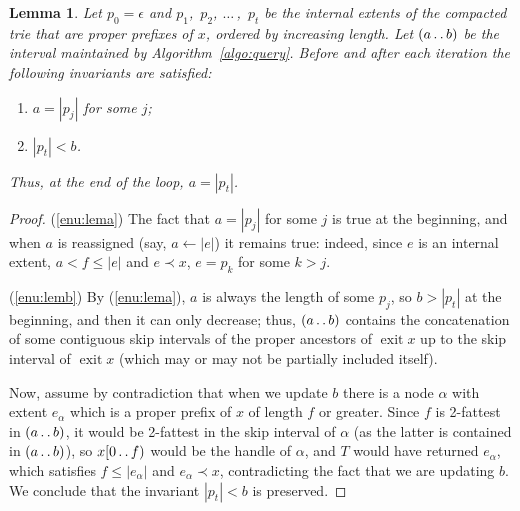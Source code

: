 \documentclass[a4paper,11pt]{article}
\newtheorem{lemma}[theorem]{Lemma}
\newcommand{\?}{\mskip1.5mu}
\def\..{\,\mathpunct{\ldotp\ldotp}} %
\DeclareMathOperator{\exit}{exit}
\begin{document}

\begin{lemma}\label{lem:correctness}
Let $p_0=\epsilon$ and $p_1$,~$p_2$,
$\dots\,$,~$p_t$ be the internal extents of the compacted
trie that are \emph{proper} prefixes of $x$, ordered by increasing length. 
Let $(a\..b)$ be the interval maintained by 
Algorithm~\ref{algo:query}. Before and after each iteration the following invariants 
are satisfied: 
\begin{enumerate}
    \item\label{enu:lema} $a=|p_j|$ for some $j$;
    \item\label{enu:lemb} $|p_t|< b$.
\end{enumerate}
Thus, at the end of the loop, $a=|p_t|$.
\end{lemma}
\begin{proof}
\noindent(\ref{enu:lema})
The fact that $a=|p_j|$ for some $j$ is true at the beginning, and when
$a$ is reassigned (say, $a \leftarrow |e|$) it remains true: indeed, since $e$
is an internal extent, $a<f\leq |e|$ and $e\prec x$, $e=p_k$ for some $k>j$.

\noindent(\ref{enu:lemb})
By (\ref{enu:lema}), $a$ is always the length of some $p_j$,
so $b>|p_t|$ at the beginning, and then it can only decrease; thus,
$(a\..b)$ contains the concatenation of some contiguous skip intervals of the
proper ancestors of $\exit x$ up to the skip interval of $\exit x$ (which may
or may not be partially included itself).

Now, assume by contradiction that when we update $b$ there is a node $\alpha$
with extent $e_\alpha$ which is a proper
prefix of $x$ of length $f$ or greater. Since $f$ is 2-fattest in $(a\..b)$, it
would be 2-fattest in the skip interval of $\alpha$ (as the latter is contained
in $(a\..b)$), so $x[0\..f)$ would be the handle of $\alpha$, and $T$ would have
returned $e_\alpha$, which satisfies $f\leq |e_\alpha|$ and $e_\alpha\prec x$, contradicting the fact that we are
updating $b$. We conclude that the invariant $|p_t|<b$ is preserved.
\end{proof}
\end{document}
